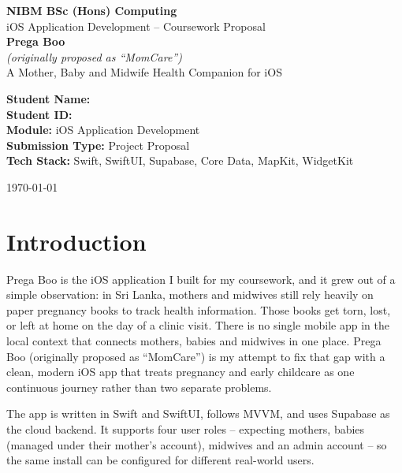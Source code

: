\documentclass[12pt,a4paper]{article}
\begin{document}
\begin{titlepage}
    \centering
    \vspace*{1cm}
    {\Large \textbf{NIBM BSc (Hons) Computing}}\\
    \vspace{0.2cm}
    {\large iOS Application Development -- Coursework Proposal}\\
    \vspace{2cm}
    {\Huge \textbf{Prega Boo}}\\
    \vspace{0.4cm}
    {\large \textit{(originally proposed as ``MomCare'')}}\\
    \vspace{0.6cm}
    {\Large A Mother, Baby and Midwife Health Companion for iOS}\\
    \vspace{2cm}
    \begin{flushleft}
        \textbf{Student Name:} \underline{\hspace{8cm}}\\[0.4cm]
        \textbf{Student ID:} \underline{\hspace{8cm}}\\[0.4cm]
        \textbf{Module:} iOS Application Development\\[0.4cm]
        \textbf{Submission Type:} Project Proposal\\[0.4cm]
        \textbf{Tech Stack:} Swift, SwiftUI, Supabase, Core Data, MapKit, WidgetKit\\
    \end{flushleft}
    \vfill
    {\large \today}
\end{titlepage}

\section{Introduction}
Prega Boo is the iOS application I built for my coursework, and it grew out of a simple observation: in Sri Lanka, mothers and midwives still rely heavily on paper pregnancy books to track health information. Those books get torn, lost, or left at home on the day of a clinic visit. There is no single mobile app in the local context that connects mothers, babies and midwives in one place. Prega Boo (originally proposed as ``MomCare'') is my attempt to fix that gap with a clean, modern iOS app that treats pregnancy and early childcare as one continuous journey rather than two separate problems.

The app is written in Swift and SwiftUI, follows MVVM, and uses Supabase as the cloud backend. It supports four user roles -- expecting mothers, babies (managed under their mother's account), midwives and an admin account -- so the same install can be configured for different real-world users.
\end{document}
